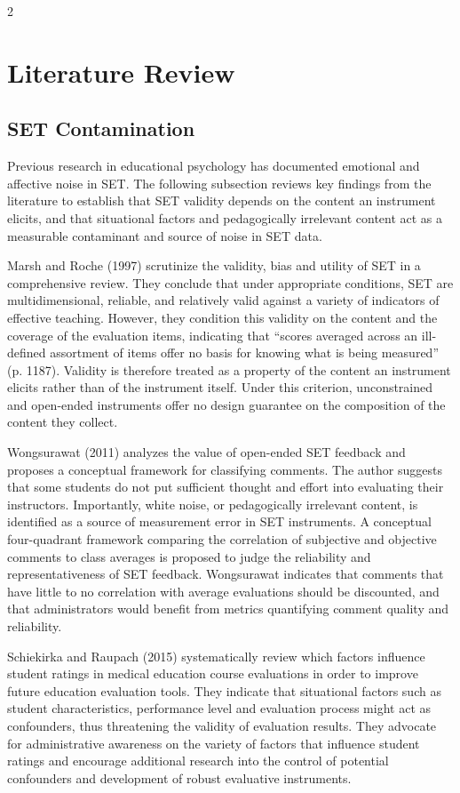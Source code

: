\documentclass{article}
\begin{document}
\begin{multicols*}{2}
\section{Literature Review}
\subsection{SET Contamination}
Previous research in educational psychology has documented emotional and affective noise in SET. The following subsection reviews key findings from the literature to establish that SET validity depends on the content an instrument elicits, and that situational factors and pedagogically irrelevant content act as a measurable contaminant and source of noise in SET data.

Marsh and Roche (1997) scrutinize the validity, bias and utility of SET in a comprehensive review. They conclude that under appropriate conditions, SET are multidimensional, reliable, and relatively valid against a variety of indicators of effective teaching. However, they condition this validity on the content and the coverage of the evaluation items, indicating that ``scores averaged across an ill-defined assortment of items offer no basis for knowing what is being measured'' (p. 1187). Validity is therefore treated as a property of the content an instrument elicits rather than of the instrument itself. Under this criterion, unconstrained and open-ended instruments offer no design guarantee on the composition of the content they collect.

Wongsurawat (2011) analyzes the value of open-ended SET feedback and proposes a conceptual framework for classifying comments. The author suggests that some students do not put sufficient thought and effort into evaluating their instructors. Importantly, white noise, or pedagogically irrelevant content, is identified as a source of measurement error in SET instruments. A conceptual four-quadrant framework comparing the correlation of subjective and objective comments to class averages is proposed to judge the reliability and representativeness of SET feedback. Wongsurawat indicates that comments that have little to no correlation with average evaluations should be discounted, and that administrators would benefit from metrics quantifying comment quality and reliability.

Schiekirka and Raupach (2015) systematically review which factors influence student ratings in medical education course evaluations in order to improve future education evaluation tools. They indicate that situational factors such as student characteristics, performance level and evaluation process might act as confounders, thus threatening the validity of evaluation results. They advocate for administrative awareness on the variety of factors that influence student ratings and encourage additional research into the control of potential confounders and development of robust evaluative instruments.


\end{multicols*}
\end{document}
